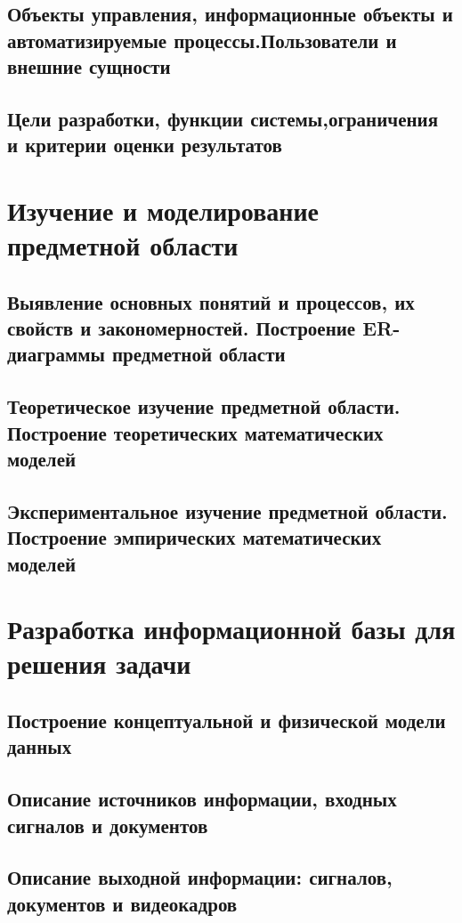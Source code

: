 \documentclass{lstu-diploma}
\begin{document}
\section{Объекты управления, информационные объекты и автоматизируемые процессы.Пользователи и внешние сущности}

\section{Цели разработки, функции системы,ограничения и критерии оценки результатов}

\chapter{Изучение и моделирование предметной области}
\section{Выявление основных понятий и процессов, их свойств и закономерностей. Построение ER-диаграммы предметной области}

\section{Теоретическое изучение предметной области. Построение теоретических математических моделей}

\section{Экспериментальное изучение предметной области. Построение эмпирических математических моделей}

\chapter{Разработка информационной базы для решения задачи}

\section{Построение концептуальной и физической модели данных}

\section{Описание источников информации, входных сигналов и документов}

\section{Описание выходной информации: сигналов, документов и видеокадров}
\end{document}
